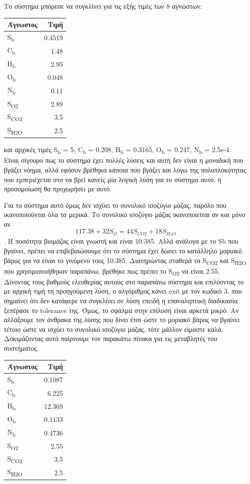 \documentclass[11pt]{article}
\begin{document}
Το σύστημα μπόρεσε να συγκλίνει για τις εξής τιμές των 8 αγνώστων:
\begin{center}
\begin{tabular}{lr}
Άγνωστος & Τιμή\\
\hline
S\textsubscript{b} & 0.4519\\
C\textsubscript{b} & 1.48\\
H\textsubscript{b} & 2.95\\
O\textsubscript{b} & 0.048\\
N\textsubscript{b} & 0.11\\
S\textsubscript{O2} & 2.89\\
S\textsubscript{CO2} & 3.5\\
S\textsubscript{H2O} & 2.5\\
\end{tabular}
\end{center}
και αρχικές τιμές S\textsubscript{b} = 5, C\textsubscript{b} = 0.208, H\textsubscript{b} = 0.3165, O\textsubscript{b} = 0.247, N\textsubscript{b} = 2.5e-4. Είναι σίγουρο πως το σύστημα έχει πολλές λύσεις και αυτή δεν είναι η μοναδική που βγάζει νόημα, αλλά εφόσον βρέθηκα κάποια που βγάζει και λόγω της πολυπλοκότητας που εμπεριέχεται στο να βρεί κανείς μία λογική λύση για το σύστημα αυτό, η προσομοίωση θα προχωρήσει με αυτό.

Για το σύστημα αυτό όμως δεν ισχύει το συνολικό ισοζύγιο μάζας, παρόλο που ικανοποιούνται όλα τα μερικά. Το συνολικό ισοζύγιο μάζας ικανοποιείται αν και μόνο αν \[ 117.38 + 32S_O = 44S_{CO2} + 18S_{H_2O} \]. Η ποσότητα βιομάζας είναι γνωστή και είναι 10.385. Αλλά ανάλογα με το Sb που βγαίνει, πρέπει να επιβεβαιώσουμε ότι το σύστημα έχει δώσει το κατάλληλο μοριακό βάρος για να είναι το γινόμενο τους 10.385. Διατηρώντας σταθερά τα S\textsubscript{CO}\textsubscript{2} και S\textsubscript{H2O} που χρησιμοποιήθηκαν παραπάνω, βρέθηκε πως πρέπει το S\textsubscript{O2} να είναι 2.55. Δίνοντας τους βαθμούς ελευθερίας αυτούς στο παραπάνω σύστημα και επιλύοντας το με αρχική τιμή τη προηγούμενη λύση, ο αλγόριθμος κάνει exit με τον κωδικό 3, που σημαίνει ότι δεν κατάφερε να συγκλίνει σε λύση επειδή η επαναληπτική διαδικασία ξεπέρασε το tolerance της. Όμως, το σφάλμα στην επίλυση είναι αρκετά μικρό. Αν αλλάξουμε τον άνθρακα της λύσης που δίνει έτσι ώστε το μοριακό βάρος να βγαίνει τέτοιο ώστε να ισχύει το συνολικό ισοζύγιο μάζας, τότε μάλλον είμαστε καλά. Δοκιμάζοντας αυτό παίρνουμε τον παρακάτω πίνακα για τις μεταβλητές του συστήματος.
\begin{center}
\begin{tabular}{lr}
Άγνωστος & Τιμή\\
\hline
S\textsubscript{b} & 0.1087\\
C\textsubscript{b} & 6.225\\
H\textsubscript{b} & 12.369\\
O\textsubscript{b} & 0.1133\\
N\textsubscript{b} & 0.4736\\
S\textsubscript{O2} & 2.55\\
S\textsubscript{CO2} & 3.5\\
S\textsubscript{H2O} & 2.5\\
\end{tabular}
\end{center}
\end{document}
